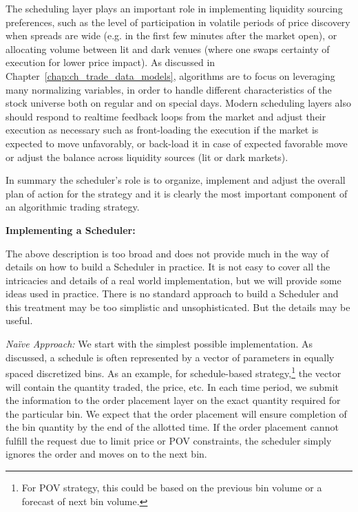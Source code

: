 The scheduling layer plays an important role in  implementing liquidity sourcing preferences, such as the level of participation in volatile periods of price discovery when spreads are wide (e.g. in the first few minutes after the market open), or allocating volume between lit and dark venues (where one swaps certainty of execution for lower price impact). As discussed in Chapter~\ref{chap:ch_trade_data_models}, algorithms are to focus on leveraging many normalizing variables, in order to handle different characteristics of the stock universe both on regular and on special days. Modern scheduling layers also should respond to realtime feedback loops from the market and adjust their execution as necessary such as front-loading the execution if the market is expected to move unfavorably, or back-load it in case of expected favorable move or adjust the balance across liquidity sources (lit or dark markets). 


In summary the scheduler's role is to organize, implement and adjust the overall plan of action for the strategy and it is clearly the most important component of an algorithmic trading strategy. \twomedskip


\noindent\textbf{Implementing a Scheduler:} \twomedskip

The above description is too broad and does not provide much in the way of details on how to build a Scheduler in practice. It is not easy to cover all the intricacies and details of a real world implementation, but we will provide some ideas used in practice. There is no standard approach to build a Scheduler and this treatment may be too simplistic and unsophisticated. But the details may be useful. \twomedskip


\noindent\emph{Na\"ive Approach:} We start with the simplest possible implementation. As discussed, a schedule is often represented by a vector of parameters in equally spaced discretized bins. As an example, for schedule-based strategy,\footnote{For POV strategy, this could be based on the previous bin volume or a forecast of next bin volume.} the vector will contain the quantity traded, the price, etc. In each time period, we submit the information to the order placement layer on the exact quantity required for the particular bin. We expect that the order placement will ensure completion of the bin quantity by the end of the allotted time. If the order placement cannot fulfill the request due to limit price or POV constraints, the scheduler simply ignores the order and moves on to the next bin. 


